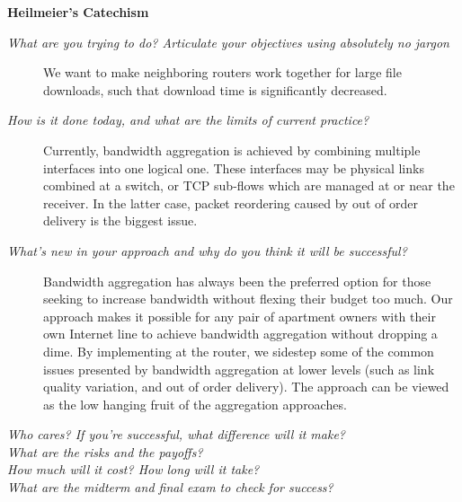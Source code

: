 \documentclass[12pt]{article}
\newcommand{\comment}[1]
{\par {\bfseries \color{blue} #1 \par}}
\begin{document}
\comment{

	{\bf Heilmeier's Catechism}\hfil\\
	\begin{description}
		\item[{\it What are you trying to do? Articulate your objectives using absolutely no jargon}]
			We want to make neighboring routers work together for large file downloads, such that download time is significantly decreased.
		\item[{\it How is it done today, and what are the limits of current practice?\\}]
			Currently, bandwidth aggregation is achieved by combining multiple interfaces into one logical one. These interfaces may be physical links combined at a switch, or TCP sub-flows which are managed at or near the receiver. In the latter case, packet reordering caused by out of order delivery is the biggest issue.

		\item[{\it What's new in your approach and why do you think it will be successful?\\}]

			Bandwidth aggregation has always been the preferred option for those seeking to increase bandwidth without flexing their budget too much. Our approach makes it possible for any pair of apartment owners with their own Internet line to achieve bandwidth aggregation without dropping a dime. By implementing at the router, we sidestep some of the common issues presented by bandwidth aggregation at lower levels (such as link quality variation, and out of order delivery). The approach can be viewed as the low hanging fruit of the aggregation approaches.

		\item[{\it Who cares? If you're successful, what difference will it make?\\}]

		\item[{\it What are the risks and the payoffs?\\}]

		\item[{\it How much will it cost? How long will it take?\\}]

		\item[{\it What are the midterm and final exam to check for success?\\}]


\end{description}}
\end{document}
